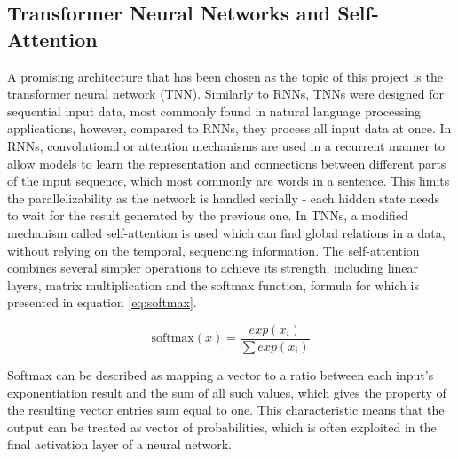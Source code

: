 \subsection{Transformer Neural Networks and Self-Attention}\label{self-attention}
A promising architecture that has been chosen as the topic of this project is the transformer neural network (TNN). Similarly to RNNs, TNNs were designed for sequential input data, most commonly found in natural language processing applications, however, compared to RNNs, they process all input data at once. In RNNs, convolutional \cite{72-keren2016convolutional} or attention mechanisms \cite{71-chorowski2015attention-based} are used in a recurrent manner to allow models to learn the representation and connections between different parts of the input sequence, which most commonly are words in a sentence. This limits the parallelizability as the network is handled serially - each hidden state needs to wait for the result generated by the previous one. In TNNs, a modified mechanism called self-attention \cite{44-vaswani2017attention} is used which can find global relations in a data, without relying on the temporal, sequencing information. The self-attention combines several simpler operations to achieve its strength, including linear layers, matrix multiplication and the softmax function, formula for which is presented in equation \ref{eq:softmax}.

\begin{equation}\label{eq:softmax}
  \text{softmax}(x) = \frac{exp(x_i)}{\sum exp(x_i)}
\end{equation}

Softmax can be described as mapping a vector to a ratio between each input's exponentiation result and the sum of all such values, which gives the property of the resulting vector entries sum equal to one. This characteristic means that the output can be treated as vector of probabilities, which is often exploited in the final activation layer of a neural network.

